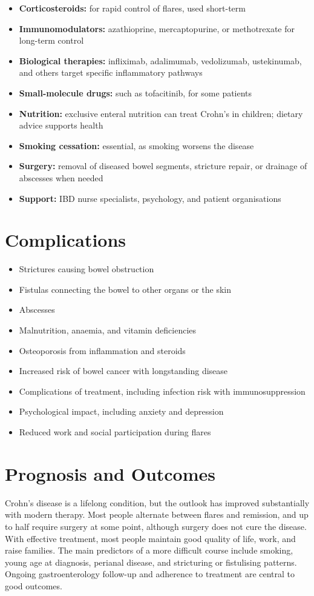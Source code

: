 \begin{itemize}
    \item \textbf{Corticosteroids:} for rapid control of flares, used short-term
    \item \textbf{Immunomodulators:} azathioprine, mercaptopurine, or methotrexate for long-term control
    \item \textbf{Biological therapies:} infliximab, adalimumab, vedolizumab, ustekinumab, and others target specific inflammatory pathways
    \item \textbf{Small-molecule drugs:} such as tofacitinib, for some patients
    \item \textbf{Nutrition:} exclusive enteral nutrition can treat Crohn's in children; dietary advice supports health
    \item \textbf{Smoking cessation:} essential, as smoking worsens the disease
    \item \textbf{Surgery:} removal of diseased bowel segments, stricture repair, or drainage of abscesses when needed
    \item \textbf{Support:} IBD nurse specialists, psychology, and patient organisations
\end{itemize}

\section*{Complications}
\begin{itemize}
    \item Strictures causing bowel obstruction
    \item Fistulas connecting the bowel to other organs or the skin
    \item Abscesses
    \item Malnutrition, anaemia, and vitamin deficiencies
    \item Osteoporosis from inflammation and steroids
    \item Increased risk of bowel cancer with longstanding disease
    \item Complications of treatment, including infection risk with immunosuppression
    \item Psychological impact, including anxiety and depression
    \item Reduced work and social participation during flares
\end{itemize}

\section*{Prognosis and Outcomes}
Crohn's disease is a lifelong condition, but the outlook has improved substantially with modern therapy. Most people alternate between flares and remission, and up to half require surgery at some point, although surgery does not cure the disease. With effective treatment, most people maintain good quality of life, work, and raise families. The main predictors of a more difficult course include smoking, young age at diagnosis, perianal disease, and stricturing or fistulising patterns. Ongoing gastroenterology follow-up and adherence to treatment are central to good outcomes.

